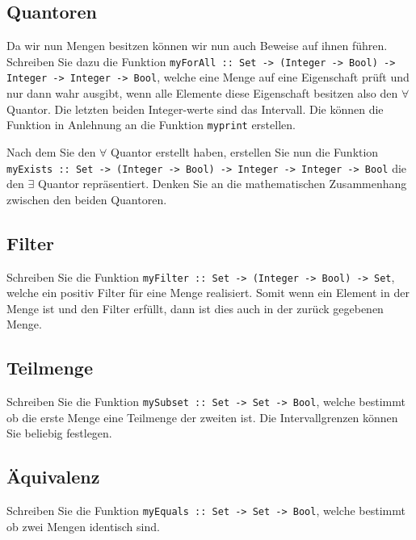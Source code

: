 \documentclass[
  10pt,                   %
  DIV12,
  german,                 %
  oneside,                %
  parskip=half,           %
  headings=normal,        %
  captions=tableheading,  %
]{scrartcl}
\begin{document}
\subsection{Quantoren}
Da wir nun Mengen besitzen können wir nun auch Beweise auf ihnen führen.
Schreiben Sie dazu die Funktion \lstinline|myForAll :: Set -> (Integer -> Bool) -> Integer -> Integer -> Bool|, welche eine Menge
auf eine Eigenschaft prüft und nur dann wahr ausgibt, wenn alle Elemente diese Eigenschaft besitzen also den $\forall$ Quantor.
Die letzten beiden Integer-werte sind das Intervall. Die können die Funktion in Anlehnung an die Funktion
\lstinline|myprint| erstellen.

Nach dem Sie den $\forall$ Quantor erstellt haben, erstellen Sie nun die Funktion \lstinline|myExists :: Set -> (Integer -> Bool) -> Integer -> Integer -> Bool| 
die den $\exists$ Quantor repräsentiert. Denken Sie an die mathematischen Zusammenhang zwischen den beiden Quantoren.

\subsection{Filter}
Schreiben Sie die Funktion \lstinline|myFilter :: Set -> (Integer -> Bool) -> Set|, welche ein positiv Filter für eine Menge
realisiert. Somit wenn ein Element in der Menge ist und den Filter erfüllt, dann ist dies auch in der zurück gegebenen Menge.

\subsection{Teilmenge}
Schreiben Sie die Funktion \lstinline|mySubset :: Set -> Set -> Bool|, welche bestimmt ob die erste Menge eine Teilmenge der zweiten ist.
Die Intervallgrenzen können Sie beliebig festlegen.

\subsection{Äquivalenz}
Schreiben Sie die Funktion \lstinline|myEquals :: Set -> Set -> Bool|, welche bestimmt ob zwei Mengen identisch sind.
\end{document}
